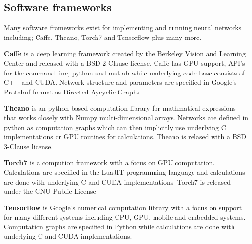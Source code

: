 
\subsection{Software frameworks}   %
Many software frameworks exist for implementing and running neural networks including; Caffe\cite{jia2014caffe}, Theano\cite{bastien2012theano}, Torch7\cite{collobert2011torch7} and Tensorflow\cite{abaditensorflow} plus many more.

\textbf{Caffe} is a deep learning framework created by the Berkeley Vision and Learning Center and released with a BSD 2-Clause license.
Caffe has GPU support, API's for the command line, python and matlab while underlying code base consists of C++ and CUDA.
Network structure and parameters are specified in Google's Protobuf format as Directed Aycyclic Graphs.

\textbf{Theano} is an python based computation library for mathmatical expressions that works closely with Numpy multi-dimensional arrays.
Networks are defined in python as computation graphs which can then implicitly use underlying C implementations or GPU routines for calculations. 
Theano is relased with a BSD 3-Clause license.

\textbf{Torch7} is a compution framework with a focus on GPU computation.
Calculations are specified in the LuaJIT programming language and calculations are done with underlying C and CUDA implementations. 
Torch7 is released under the GNU Public License.

\textbf{Tensorflow} is Google's numerical computation library with a focus on support for many different systems including CPU, GPU, mobile and embedded systems.
Computation graphs are specified in Python while calculations are done with underlying C and CUDA implementations. 

